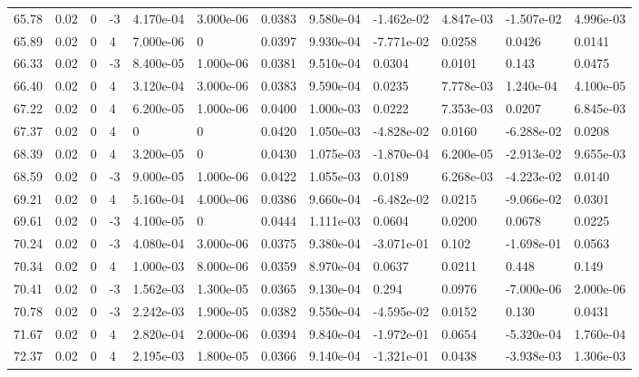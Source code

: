 \documentclass[preview]{standalone}
\begin{document}
{{{{{\begin{tabular}{L{1.2cm}C{1.2cm} C{0.3cm}C{0.5cm} C{1.4cm}C{1.4cm} C{1.4cm}C{1.4cm} C{1.6cm}C{1.6cm} C{1.6cm}C{1.6cm}}
  65.78  &  0.02  & 0     & -3 &  4.170e-04  & 3.000e-06  &  0.0383&   9.580e-04& -1.462e-02 & 4.847e-03   &  -1.507e-02 & 4.996e-03  \\ 
  65.89  &  0.02  & 0     &  4 &  7.000e-06  & 0  &  0.0397&   9.930e-04& -7.771e-02 & 0.0258   &  0.0426 & 0.0141  \\ 
  66.33  &  0.02  & 0     & -3 &  8.400e-05  & 1.000e-06  &  0.0381&   9.510e-04& 0.0304 & 0.0101   &  0.143 & 0.0475  \\ 
  66.40  &  0.02  & 0     &  4 &  3.120e-04  & 3.000e-06  &  0.0383&   9.590e-04& 0.0235 & 7.778e-03   &  1.240e-04 & 4.100e-05  \\ 
  67.22  &  0.02  & 0     &  4 &  6.200e-05  & 1.000e-06  &  0.0400&   1.000e-03& 0.0222 & 7.353e-03   &  0.0207 & 6.845e-03  \\ 
  67.37  &  0.02  & 0     &  4 &  0  & 0  &  0.0420&   1.050e-03& -4.828e-02 & 0.0160   &  -6.288e-02 & 0.0208  \\ 
  68.39  &  0.02  & 0     &  4 &  3.200e-05  & 0  &  0.0430&   1.075e-03& -1.870e-04 & 6.200e-05   &  -2.913e-02 & 9.655e-03  \\ 
  68.59  &  0.02  & 0     & -3 &  9.000e-05  & 1.000e-06  &  0.0422&   1.055e-03& 0.0189 & 6.268e-03   &  -4.223e-02 & 0.0140  \\ 
  69.21  &  0.02  & 0     &  4 &  5.160e-04  & 4.000e-06  &  0.0386&   9.660e-04& -6.482e-02 & 0.0215   &  -9.066e-02 & 0.0301  \\ 
  69.61  &  0.02  & 0     & -3 &  4.100e-05  & 0  &  0.0444&   1.111e-03& 0.0604 & 0.0200   &  0.0678 & 0.0225  \\ 
  70.24  &  0.02  & 0     & -3 &  4.080e-04  & 3.000e-06  &  0.0375&   9.380e-04& -3.071e-01 & 0.102   &  -1.698e-01 & 0.0563  \\ 
  70.34  &  0.02  & 0     &  4 &  1.000e-03  & 8.000e-06  &  0.0359&   8.970e-04& 0.0637 & 0.0211   &  0.448 & 0.149  \\ 
  70.41  &  0.02  & 0     & -3 &  1.562e-03  & 1.300e-05  &  0.0365&   9.130e-04& 0.294 & 0.0976   &  -7.000e-06 & 2.000e-06  \\ 
  70.78  &  0.02  & 0     & -3 &  2.242e-03  & 1.900e-05  &  0.0382&   9.550e-04& -4.595e-02 & 0.0152   &  0.130 & 0.0431  \\ 
  71.67  &  0.02  & 0     &  4 &  2.820e-04  & 2.000e-06  &  0.0394&   9.840e-04& -1.972e-01 & 0.0654   &  -5.320e-04 & 1.760e-04  \\ 
  72.37  &  0.02  & 0     &  4 &  2.195e-03  & 1.800e-05  &  0.0366&   9.140e-04& -1.321e-01 & 0.0438   &  -3.938e-03 & 1.306e-03  \\ 

\end{tabular}}}}}}
\end{document}
